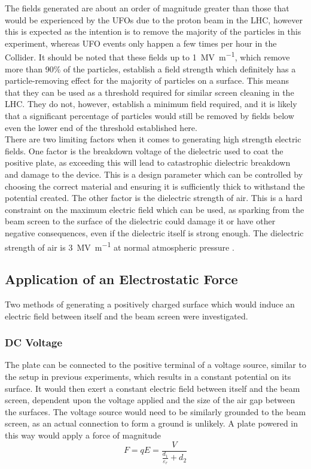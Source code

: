 \documentclass[../main.tex]{subfiles}
\begin{document}
The fields generated are about an order of magnitude greater than those that would be experienced by the UFOs due to the proton beam in the LHC, however this is expected as the intention is to remove the majority of the particles in this experiment, whereas UFO events only happen a few times per hour in the Collider.
It should be noted that these fields up to \SI{1}{\mega\volt\per\metre}, which remove more than 90\% of the particles, establish a field strength which definitely has a particle-removing effect for the majority of particles on a surface.
This means that they can be used as a threshold required for similar screen cleaning in the LHC.
They do not, however, establish a minimum field required, and it is likely that a significant percentage of particles would still be removed by fields below even the lower end of the threshold established here.\\

There are two limiting factors when it comes to generating high strength electric fields.
One factor is the breakdown voltage of the dielectric used to coat the positive plate, as exceeding this will lead to catastrophic dielectric breakdown and damage to the device.
This is a design parameter which can be controlled by choosing the correct material and ensuring it is sufficiently thick to withstand the potential created.
The other factor is the dielectric strength of air.                      
This is a hard constraint on the maximum electric field which can be used, as sparking from the beam screen to the surface of the dielectric could damage it or have other negative consequences, even if the dielectric itself is strong enough.
The dielectric strength of air is \SI{3}{\mega\volt\per\metre} at normal atmospheric pressure \cite{dielectricStrengthAir}.

\subsection{Application of an Electrostatic Force}
Two methods of generating a positively charged surface which would induce an electric field between itself and the beam screen were investigated.

\subsubsection{DC Voltage}
The plate can be connected to the positive terminal of a voltage source, similar to the setup in previous experiments, which results in a constant potential on its surface.
It would then exert a constant electric field between itself and the beam screen, dependent upon the voltage applied and the size of the air gap between the surfaces.
The voltage source would need to be similarly grounded to the beam screen, as an actual connection to form a ground is unlikely.
A plate powered in this way would apply a force of magnitude
\begin{equation}
	F = qE = \frac{V}{\frac{d_{1}}{\varepsilon_{r}} + d_{2}}
\end{equation}
\end{document}
